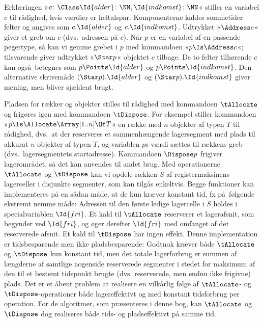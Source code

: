 Erklæringen »$c \colon \Class \Id{alder} \colon \NN, \Id{indkomst} \colon \NN$«
stiller en variabel $c$ til rådighed, hvis værdier er heltalspar.
Komponenterne kaldes sommetider felter og angives som $c.\Id{alder}$ og $c.\Id{indkomst}$.
Udtrykket »$\Address c$«
giver et greb om $c$ (dvs.\ adressen på $c$).
Når $p$ er en variabel af en passende pegertype, så kan vi gemme grebet i $p$ med kommandoen »$p \Is \Address c$«; tilsvarende giver udtrykket »$\Star p$« objektet $c$ tilbage.
De to felter
tilhørende $c$ kan også betegnes som $p\Points \Id{alder}$ og $p\Points\Id{indkomst}$.
Den alternative skrivemåde $(\Star p).\Id{alder}$ og $(\Star p).\Id{indkomst}$ giver mening, men bliver sjældent brugt.

Pladsen for rækker og objekter stilles til rådighed med kommandoen $\tAllocate$ og frigøres igen med kommandoen $\tDispose$.
For eksempel stiller kommandoen »$p\Is\Allocate \Array[1..n] \Of T$«
en række med $n$ objekter af typen $T$ til rådighed, dvs.\ at der reserveres et sammenhængende lagersegment med plads til akkurat $n$ objekter af typen $T$, og variablen $p$s værdi sættes til rækkens greb (dvs.\ lagersegmentets startadresse).
Kommandoen $\Dispose p$
frigiver lagerområdet, så det kan anvendes til andet brug.
Med operationerne $\tAllocate$ og $\tDispose$ kan vi opdele rækken $S$ af registermaksinens lagerceller i disjunkte segmenter, som kan tilgås enkeltvis.
Begge funktioner kan implementeres på en sådan måde, at de kun kræver konstant tid, 
fx på følgende ekstremt nemme måde:
Adressen til den første ledige lagercelle i $S$ holdes i specialvariablen $\Id{fri}$.
Et kald til $\tAllocate$ reserverer et lagerafsnit, som begynder ved $\Id{fri}$, og øger derefter $\Id{fri}$ med omfanget af det reserverede afsnit.
Et kald til $\tDispose$ har ingen effekt.
Denne implementation er tidsbesparende men ikke pladsbesparende:
Godtnok kræver både $\tAllocate$ og $\tDispose$ kun konstant tid, men det totale lagerforbrug er summen af længderne af samtlige nogenside reserverede segmenter i stedet for maksimum af den til et bestemt tidspunkt brugte (dvs. reserverede, men endnu ikke frigivne) plads.
Det er et åbent problem at realisere en vilkårlig følge af $\tAllocate$- og $\tDispose$-operationer både lagereffektivt og med konstant tidsforbrug per operation.
For de algoritmer, som præsenteres i denne bog, kan $\tAllocate$ og $\tDispose$ dog realiseres både tids- og pladseffektivt på samme tid.

